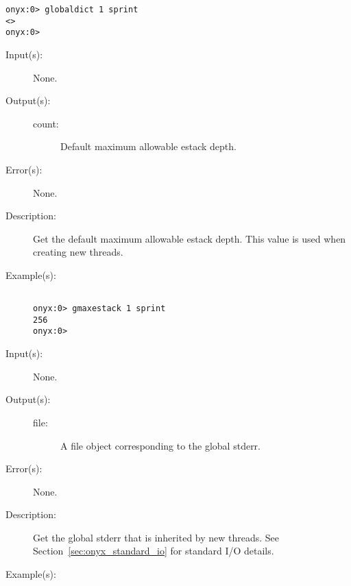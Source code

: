 \begin{description}
\begin{description}
\begin{verbatim}
onyx:0> globaldict 1 sprint
<>
onyx:0>
		\end{verbatim}
	\end{description}
\label{systemdict:gmaxestack}
\item[{\onyxop{--}{gmaxestack}{count}}: ]
	\begin{description}\item[]
	\item[Input(s): ] None.
	\item[Output(s): ]
		\begin{description}\item[]
		\item[count: ]
			Default maximum allowable estack depth.
		\end{description}
	\item[Error(s): ] None.
	\item[Description: ]
		Get the default maximum allowable estack depth.  This value is
		used when creating new threads.
	\item[Example(s): ]\begin{verbatim}

onyx:0> gmaxestack 1 sprint
256
onyx:0>
		\end{verbatim}
	\end{description}
\label{systemdict:gstderr}
\item[{\onyxop{--}{gstderr}{file}}: ]
	\begin{description}\item[]
	\item[Input(s): ] None.
	\item[Output(s): ]
		\begin{description}\item[]
		\item[file: ]
			A file object corresponding to the global stderr.
		\end{description}
	\item[Error(s): ] None.
	\item[Description: ]
		Get the global stderr that is inherited by new threads.  See
		Section~\ref{sec:onyx_standard_io} for standard I/O details.
	\item[Example(s): ]\begin{verbatim}


\end{verbatim}
\end{description}
\end{description}
